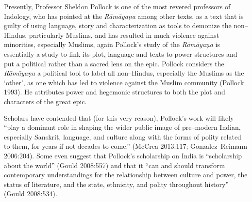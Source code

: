 Presently, Professor Sheldon Pollock is one of the most revered professors of Indology, who has pointed at the \textit{Rāmāyaṇa} among other texts, as a text that is guilty of using language, story and characterization as tools to demonize the non–Hindus, particularly Muslims, and has resulted in much violence against minorities, especially Muslims, again Pollock’s study of the \textit{Rāmāyaṇa} is essentially a study to link its plot, language and texts to power structures and put a political rather than a sacred lens on the epic. Pollock considers the \textit{Rāmāyaṇa} a political tool to label all non–Hindus, especially the Muslims as the ‘other’, as one which has led to violence against the Muslim community (Pollock 1993). He attributes power and hegemonic structures to both the plot and characters of the great epic.

Scholars have contended that (for this very reason), Pollock’s work will likely “play a dominant role in shaping the wider public image of pre–modern Indian, especially Sanskrit, language, and culture along with the forms of polity related to them, for years if not decades to come.” (McCrea 2013:117; Gonzalez–Reimann 2006:204). Some even suggest that Pollock’s scholarship on India is “scholarship about the world” (Gould 2008:557) and that it “can and should transform contemporary understandings for the relationship between culture and power, the status of literature, and the state, ethnicity, and polity throughout history” (Gould 2008:534).

